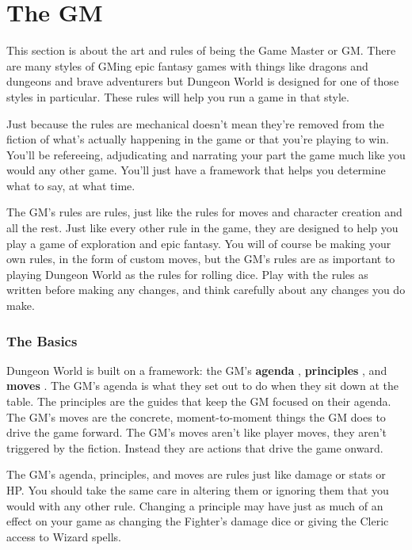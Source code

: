 \chapter{The GM}
  
            

This section is about the art and rules of being the Game Master or GM. There are many styles of GMing epic fantasy games with things like dragons and dungeons and brave adventurers but Dungeon World is designed for one of those styles in particular. These rules will help you run a game in that style.

       

Just because the rules are mechanical doesn't mean they're removed from the fiction of what's actually happening in the game or that you're playing to win. You'll be refereeing, adjudicating and narrating your part the game much like you would any other game. You'll just have a framework that helps you determine what to say, at what time.

       

The GM's rules are rules, just like the rules for moves and character creation and all the rest. Just like every other rule in the game, they are designed to help you play a game of exploration and epic fantasy. You will of course be making your own rules, in the form of custom moves, but the GM's rules are as important to playing Dungeon World as the rules for rolling dice. Play with the rules as written before making any changes, and think carefully about any changes you do make.

       
\subsection{The Basics}   
       

Dungeon World is built on a framework: the GM's {\bf agenda} , {\bf principles} , and {\bf moves} . The GM's agenda is what they set out to do when they sit down at the table. The principles are the guides that keep the GM focused on their agenda. The GM's moves are the concrete, moment-to-moment things the GM does to drive the game forward. The GM's moves aren't like player moves, they aren't triggered by the fiction. Instead they are actions that drive the game onward.

       

The GM's agenda, principles, and moves are rules just like damage or stats or HP. You should take the same care in altering them or ignoring them that you would with any other rule. Changing a principle may have just as much of an effect on your game as changing the Fighter's damage dice or giving the Cleric access to Wizard spells.

